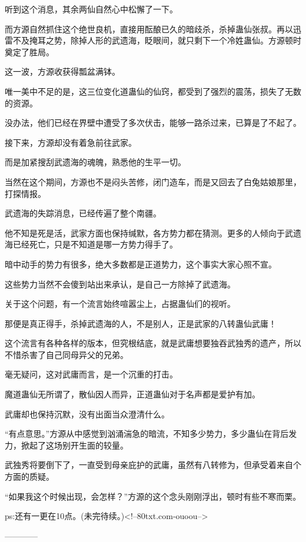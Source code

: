 \begin{this_body}
听到这个消息，其余两仙自然心中松懈了一下。

而方源自然抓住这个绝世良机，直接用酝酿已久的暗歧杀，杀掉蛊仙张叔。再以迅雷不及掩耳之势，除掉人形的武遗海，眨眼间，就只剩下一个冷姓蛊仙。方源顿时奠定了胜局。

这一波，方源收获得瓢盆满钵。

唯一美中不足的是，这三位变化道蛊仙的仙窍，都受到了强烈的震荡，损失了无数的资源。

没办法，他们已经在界壁中遭受了多次伏击，能够一路杀过来，已算是了不起了。

接下来，方源却没有着急前往武家。

而是加紧搜刮武遗海的魂魄，熟悉他的生平一切。

当然在这个期间，方源也不是闷头苦修，闭门造车，而是又回去了白兔姑娘那里，打探情报。

武遗海的失踪消息，已经传遍了整个南疆。

他不知是死是活，武家方面也保持缄默，各方势力都在猜测。更多的人倾向于武遗海已经死亡，只是不知道是哪一方势力得手了。

暗中动手的势力有很多，绝大多数都是正道势力，这个事实大家心照不宣。

这些势力当然不会傻到站出来承认，是自己一方除掉了武遗海。

关于这个问题，有一个流言始终喧嚣尘上，占据蛊仙们的视听。

那便是真正得手，杀掉武遗海的人，不是别人，正是武家的八转蛊仙武庸！

这个流言有各种各样的版本，但究根结底，就是武庸想要独吞武独秀的遗产，所以不惜杀害了自己同母异父的兄弟。

毫无疑问，这对武庸而言，是一个沉重的打击。

魔道蛊仙无所谓了，散仙因人而异，正道蛊仙对于名声都是爱护有加。

武庸却也保持沉默，没有出面当众澄清什么。

“有点意思。”方源从中感觉到汹涌湍急的暗流，不知多少势力，多少蛊仙在背后发力，掀起了这场别开生面的较量。

武独秀将要倒下了，一直受到母亲庇护的武庸，虽然有八转修为，但承受着来自个方面的质疑。

“如果我这个时候出现，会怎样？”方源的这个念头刚刚浮出，顿时有些不寒而栗。

ps:还有一更在10点。(未完待续。)<!--80txt.com-ouoou-->

------------

\end{this_body}


